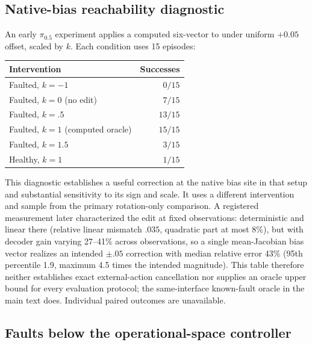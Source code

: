 \subsection{Native-bias reachability diagnostic}
\label{app:oracle}

An early $\pi_{0.5}$ experiment applies a computed six-vector to
 under uniform $+0.05$ offset, scaled by $k$.
Each condition uses 15 episodes:
\begin{center}\small
\begin{tabular}{lr}
\toprule
Intervention & Successes\\
\midrule
Faulted, $k=-1$ & $0/15$\\
Faulted, $k=0$ (no edit) & $7/15$\\
Faulted, $k=.5$ & $13/15$\\
Faulted, $k=1$ (computed oracle) & $15/15$\\
Faulted, $k=1.5$ & $3/15$\\
Healthy, $k=1$ & $1/15$\\
\bottomrule
\end{tabular}
\end{center}
This diagnostic establishes a useful correction at the native bias site in
that setup and substantial sensitivity to its sign and scale. It uses a
different intervention and sample from the primary rotation-only comparison.
A registered measurement later characterized the edit at fixed observations:
deterministic and linear there (relative linear mismatch $.035$, quadratic
part at most 8\%), but with decoder gain varying 27--41\% across
observations, so a single mean-Jacobian bias vector realizes an intended
$\pm.05$ correction with median relative error 43\% (95th percentile 1.9,
maximum 4.5 times the intended magnitude). This table therefore neither
establishes exact external-action cancellation nor supplies an oracle upper
bound for every evaluation protocol; the same-interface known-fault oracle
in the main text does. Individual paired outcomes are unavailable.

\subsection{Faults below the operational-space controller}
\label{app:joint}

